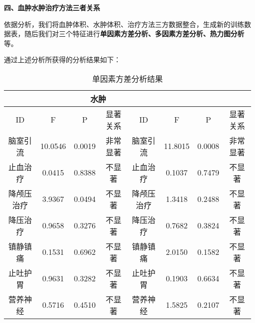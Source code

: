 \documentclass[bwprint]{gmcmthesis}
\begin{document}
				\textbf{四、血肿水肿治疗方法三者关系}
				
				依据分析，我们将血肿体积、水肿体积、治疗方法三方数据整合，生成新的训练数据表，随后我们对三个特征进行\textbf{单因素方差分析、多因素方差分析、热力图分析}等。
				
				通过上述分析所获得的分析结果如下：
				
				\begin{table}[H]
					\centering
					\label{tab:11}
					\caption{单因素方差分析结果}
					\begin{tabular}{|c|c|c|c|c|c|c|c|}
						\hline
						\rowcolor{green!35} \multicolumn{4}{|c|}{血肿} & \multicolumn{4}{c|}{水肿}\\ \hline
						\rowcolor{green!25} ID & F & P & 显著关系 & ID & F & P & 显著关系 \\ \hline
						\rowcolor{green!5}脑室引流 & 10.0546 & 0.0019 & 非常显著 & 脑室引流 & 11.8015 & 0.0008 & 非常显著 \\ \hline
						\rowcolor{white!5}止血治疗 & 0.0415 & 0.8388 & 不显著 & 止血治疗 & 0.1037 & 0.7479 & 不显著 \\ \hline
						\rowcolor{green!5}降颅压治疗 & 3.9367 & 0.0494 & 不显著 & 降颅压治疗 & 1.3418 & 0.2488 & 不显著 \\ \hline
						\rowcolor{white!5}降压治疗 & 0.9658 & 0.3276 & 不显著 & 降压治疗 & 0.7682 & 0.3824 & 不显著 \\ \hline
						\rowcolor{green!5}镇静镇痛 & 0.1531 & 0.6962 & 不显著 & 镇静镇痛 & 2.0150 & 0.1582 & 不显著 \\ \hline
						\rowcolor{white!5}止吐护胃 & 0.9631 & 0.3282 & 不显著 & 止吐护胃 & 0.1903 & 0.6634 & 不显著 \\ \hline
						\rowcolor{green!5}营养神经 & 0.5716 & 0.4510 & 不显著 & 营养神经 & 1.5825 & 0.2107 & 不显著 \\ \hline
					\end{tabular}
				\end{table}
				
\end{document}

